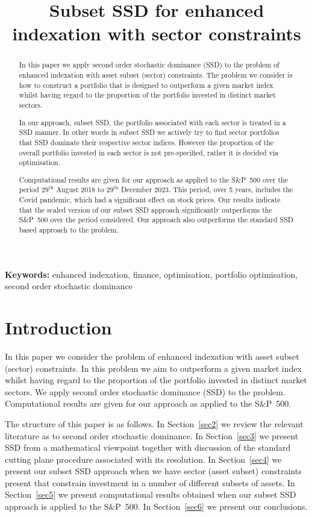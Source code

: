 
\title{Subset SSD for enhanced indexation with sector constraints}
\maketitle

\begin{abstract}

In this paper we apply second order stochastic dominance (SSD) to the problem of enhanced indexation with asset subset (sector) constraints. The problem we
 consider is how to construct a portfolio that is
designed to outperform a given market index whilst having regard to the proportion of the portfolio invested in distinct market sectors. 

In our approach, subset SSD,  the portfolio associated with each sector is treated in a SSD manner. 
In other words in subset SSD we actively try to find sector portfolios that SSD dominate their respective sector indices.
However the proportion of the overall portfolio 
invested in each sector is not pre-specified, rather it is decided via optimisation.

Computational results are given for our approach as applied to the S\&P~500 over the period 
$29^{\text{th}}$ August 2018 to $29^{\text{th}}$ December 2023. This period, over 5 years, includes the Covid pandemic, 
which had a significant effect on stock prices.
Our results indicate that the scaled version of our subset SSD
approach significantly outperforms the S\&P~500 over the period considered. Our approach also outperforms the standard SSD based
approach to the problem.
\end{abstract}

{\bf Keywords:} enhanced indexation, finance, optimisation, portfolio optimisation, second order stochastic dominance

\section{Introduction}

In this paper we consider the problem of enhanced indexation with asset subset (sector) constraints. In this problem we aim to 
outperform a given market index whilst having regard to the proportion of the portfolio invested in distinct market sectors. We apply second 
order stochastic dominance (SSD) to the problem. Computational results are given for our approach as applied to the S\&P~500.


The structure of this paper is as follows. In Section~\ref{sec2} we review the relevant literature as to second order stochastic 
dominance. In Section~\ref{sec3} we
 present SSD from a mathematical viewpoint together with discussion of  the standard cutting plane 
procedure associated with its resolution. 
In Section~\ref{sec4} we present our subset SSD approach  when we have sector (asset subset) constraints present that constrain 
investment in a number of different subsets of assets. In Section~\ref{sec5} we present computational results obtained 
when our subset SSD approach is applied to the S\&P~500. In Section~\ref{sec6} we present our conclusions.

